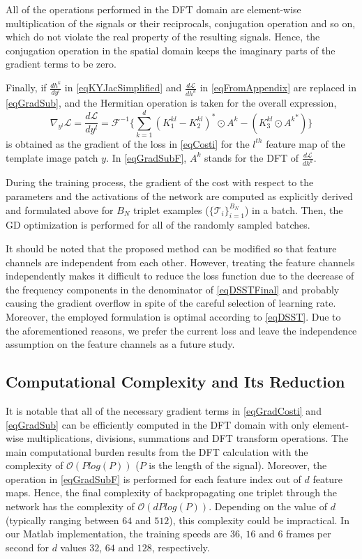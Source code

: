 \documentclass[journal]{IEEEtran}
\begin{document}
All of the operations performed in the DFT domain are element-wise multiplication of the signals or their reciprocals, conjugation operation and so on, which do not violate the real property of the resulting signals. Hence, the conjugation operation in the spatial domain keeps the imaginary parts of the gradient terms to be zero.

Finally, if $\frac{d h^k}{d y^l}$ in \eqref{eqKYJacSimplified} and $\frac{d\mathcal{L}}{dh^k}$ in \eqref{eqFromAppendix} are replaced in \eqref{eqGradSub}, and the Hermitian operation is taken for the overall expression,
\begin{equation}
\label{eqGradSubF}
\nabla_{y^l}\mathcal{L}=\frac{d \mathcal{L}}{d y^l} = \mathcal{F}^{-1}\{\sum\limits_{k=1}^d (K_1^{kl}-K_2^{kl})^* \odot A^k-(K_3^{kl}\odot {A^k}^*) \}
\end{equation}
is obtained as the gradient of the loss in \eqref{eqCosti} for the $l^{th}$ feature map of the template image patch $y$. In \eqref{eqGradSubF}, $A^k$ stands for the DFT of $\frac{d \mathcal{L}}{d h^k}$.

During the training process, the gradient of the cost with respect to the parameters and the activations of the network are computed as explicitly derived and formulated above for $B_N$ triplet examples ($\{\mathcal{T}_i\}_{i=1}^{B_N}$) in a batch. Then, the GD optimization is performed for all of the randomly sampled batches. 

It should be noted that the proposed method can be modified so that feature channels are independent from each other. However, treating the feature channels independently makes it difficult to reduce the loss function due to the decrease of the frequency components in the denominator of \eqref{eqDSSTFinal} and probably causing the gradient overflow in spite of the careful selection of learning rate. Moreover, the employed formulation is optimal according to \eqref{eqDSST}. Due to the aforementioned reasons, we prefer the current loss and leave the independence assumption on the feature channels as a future study.
\subsection{Computational Complexity and Its Reduction}
\label{secComplexity}
It is notable that all of the necessary gradient terms in \eqref{eqGradCosti} and \eqref{eqGradSub} can be efficiently computed in the DFT domain with only element-wise multiplications, divisions, summations and DFT transform operations. The main computational burden results from the DFT calculation with the complexity of $\mathcal{O}({Plog(P)})$ ($P$ is the length of the signal). Moreover, the operation in \eqref{eqGradSubF} is performed for each feature index out of $d$ feature maps. Hence, the final complexity of backpropagating one triplet through the network has the complexity of $\mathcal{O}(d{Plog(P)})$. Depending on the value of $d$ (typically ranging between $64$ and $512$), this complexity could be impractical. In our Matlab implementation, the training speeds are $36$, $16$ and $6$ frames per second for $d$ values $32$, $64$ and $128$, respectively.
\end{document}
